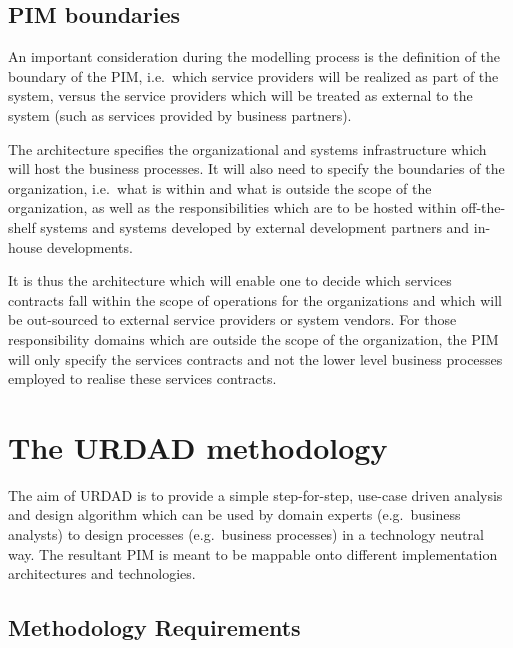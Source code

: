 \documentclass[reviewcopy]{elsart}
\begin{document}

\subsection{PIM boundaries}

An important consideration during the modelling process is the definition of the
boundary of the PIM, i.e.\ which service providers will be realized as part of the
system, versus the service providers which will be treated as external to the
system (such as services provided by business partners).

The architecture specifies the organizational and systems infrastructure which
will host the business processes. It will also need to specify the boundaries of
the organization, i.e.\ what is within and what is outside the scope of the
organization, as well as the responsibilities which are to be hosted within
off-the-shelf systems and systems developed by external development partners
and in-house developments.

It is thus the architecture which will enable one to decide which
services contracts fall within the scope of operations for the organizations and
which will be out-sourced to external service providers or system vendors. For
those responsibility domains which are outside the scope of the organization,
the PIM will only specify the services contracts and not the lower level
business processes employed to realise these services contracts.


\section{The URDAD methodology}

The aim of URDAD is to provide a simple step-for-step, use-case driven analysis
and design algorithm which can be used by domain experts (e.g.\ business
analysts) to design processes (e.g.\ business processes) in a technology neutral
way. The resultant PIM is meant to be
mappable onto different implementation architectures and technologies.


\subsection{Methodology Requirements}
\end{document}
